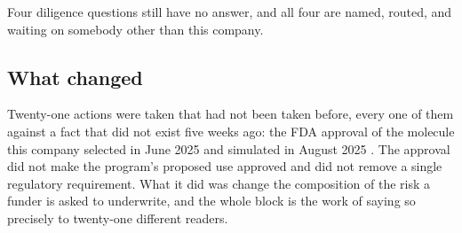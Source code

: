 Four diligence questions still have no answer, and all four are named, routed,
and waiting on somebody other than this company.

\subsection{What changed}

Twenty-one actions were taken that had not been taken before, every one of them
against a fact that did not exist five weeks ago: the FDA approval of the
molecule this company selected in June 2025 and simulated in August 2025
\cite{fdarasonque2026,daraxident,qspmetpancre}. The approval did not make the
program's proposed use approved and did not remove a single regulatory
requirement. What it did was change the composition of the risk a funder is asked
to underwrite, and the whole block is the work of saying so precisely to
twenty-one different readers.
